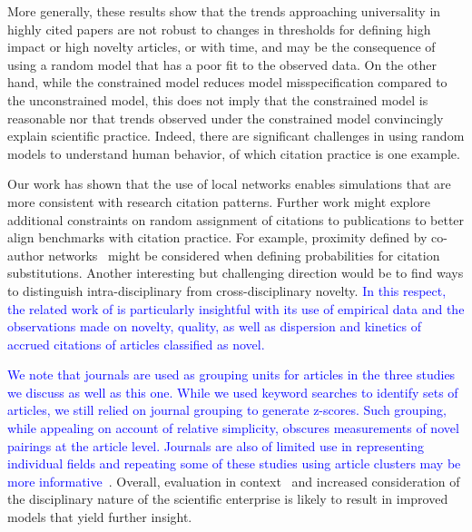 \documentclass[NETN]{stjour}
\begin{document}
{More generally, these results show that the trends approaching universality in highly cited papers are not robust to changes in thresholds for defining high impact or high novelty articles, or with time, and may be the consequence of using a random model that has a poor fit to the observed data. On the other hand, while  the constrained model reduces model misspecification compared to the unconstrained model, this does not imply that the constrained model is reasonable nor that trends observed under the constrained model convincingly explain scientific practice. Indeed, there are significant  challenges in using random models to understand human behavior, of which citation practice is one example.

Our work has shown that the use of local networks enables simulations that are more consistent with research citation patterns. Further work might explore additional constraints on random assignment of citations to publications to better align benchmarks with citation practice. For example, proximity defined by co-author networks~\citep{wallace_lariviere_gingras_2012} might be considered when defining probabilities for citation substitutions. Another interesting but challenging direction would be to find ways to distinguish intra-disciplinary from cross-disciplinary novelty. \textcolor{blue}{In this respect, the related work of \citep{wang_bias_2017} is particularly insightful with its use of empirical data and the observations made on novelty, quality, as well as dispersion and kinetics of accrued citations of articles classified as novel.} 

\textcolor{blue}{We note that journals are used as grouping units for articles in the three studies we discuss \citep{wang_bias_2017, uzzi_atypical_2013, boyack_vs_uzzi_2014} as well as this one. While we used keyword searches to identify sets of articles, we still relied on journal grouping to generate z-scores. Such grouping, while appealing on account of relative simplicity, obscures measurements of novel pairings at the article level. Journals are also of limited use in representing individual fields and repeating some of these studies using article clusters may be more informative~\cite{traag_louvain_2019, klavans_which_2017}}.  Overall, evaluation in context~\citep{hicks_bibliometrics:_2015} and increased consideration of the disciplinary nature of the scientific enterprise is likely to result in improved models that yield further insight.

}
\end{document}
